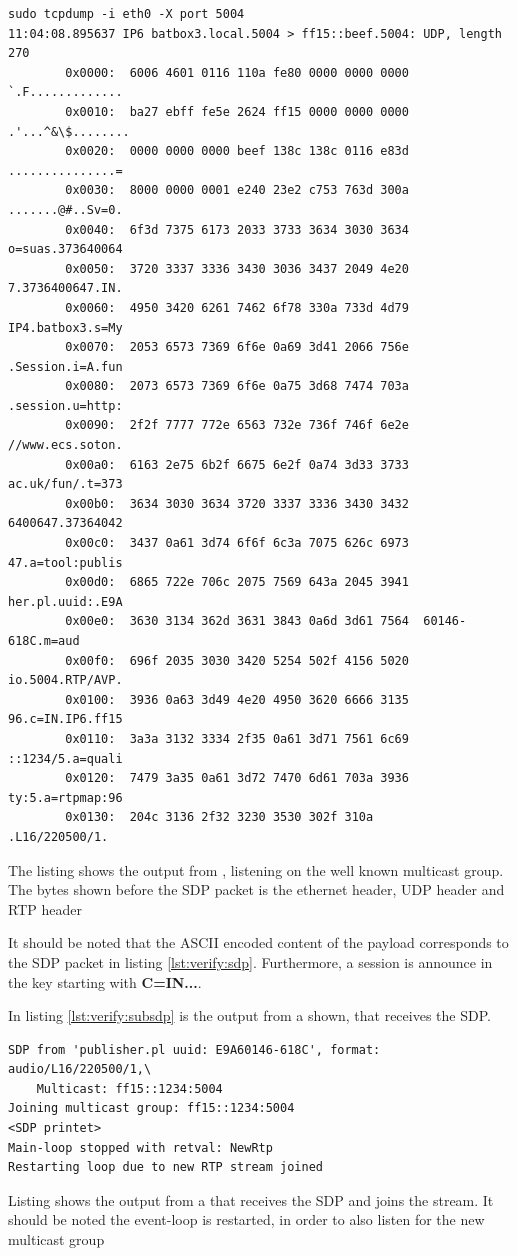 \begin{listing}[H] 
	\begin{verbatim}
sudo tcpdump -i eth0 -X port 5004
11:04:08.895637 IP6 batbox3.local.5004 > ff15::beef.5004: UDP, length 270
        0x0000:  6006 4601 0116 110a fe80 0000 0000 0000  `.F.............
        0x0010:  ba27 ebff fe5e 2624 ff15 0000 0000 0000  .'...^&\$........
        0x0020:  0000 0000 0000 beef 138c 138c 0116 e83d  ...............=
        0x0030:  8000 0000 0001 e240 23e2 c753 763d 300a  .......@#..Sv=0.
        0x0040:  6f3d 7375 6173 2033 3733 3634 3030 3634  o=suas.373640064
        0x0050:  3720 3337 3336 3430 3036 3437 2049 4e20  7.3736400647.IN.
        0x0060:  4950 3420 6261 7462 6f78 330a 733d 4d79  IP4.batbox3.s=My
        0x0070:  2053 6573 7369 6f6e 0a69 3d41 2066 756e  .Session.i=A.fun
        0x0080:  2073 6573 7369 6f6e 0a75 3d68 7474 703a  .session.u=http:
        0x0090:  2f2f 7777 772e 6563 732e 736f 746f 6e2e  //www.ecs.soton.
        0x00a0:  6163 2e75 6b2f 6675 6e2f 0a74 3d33 3733  ac.uk/fun/.t=373
        0x00b0:  3634 3030 3634 3720 3337 3336 3430 3432  6400647.37364042
        0x00c0:  3437 0a61 3d74 6f6f 6c3a 7075 626c 6973  47.a=tool:publis
        0x00d0:  6865 722e 706c 2075 7569 643a 2045 3941  her.pl.uuid:.E9A
        0x00e0:  3630 3134 362d 3631 3843 0a6d 3d61 7564  60146-618C.m=aud
        0x00f0:  696f 2035 3030 3420 5254 502f 4156 5020  io.5004.RTP/AVP.
        0x0100:  3936 0a63 3d49 4e20 4950 3620 6666 3135  96.c=IN.IP6.ff15
        0x0110:  3a3a 3132 3334 2f35 0a61 3d71 7561 6c69  ::1234/5.a=quali
        0x0120:  7479 3a35 0a61 3d72 7470 6d61 703a 3936  ty:5.a=rtpmap:96
        0x0130:  204c 3136 2f32 3230 3530 302f 310a       .L16/220500/1.
	\end{verbatim}
\caption{The listing shows the output from , listening on the well known multicast group. The bytes shown before the SDP packet is the ethernet header, UDP header and RTP header}
\label{lst:verify:tcpdumpsdp}
\end{listing}

It should be noted that the ASCII encoded content of the payload corresponds to the SDP packet in listing \ref{lst:verify:sdp}. Furthermore, a session is announce in the key starting with \textbf{C=IN...}.

In listing \ref{lst:verify:subsdp} is the output from a \sub{} shown, that receives the SDP.


\begin{listing}[H] 
\begin{verbatim}
SDP from 'publisher.pl uuid: E9A60146-618C', format: audio/L16/220500/1,\
	Multicast: ff15::1234:5004
Joining multicast group: ff15::1234:5004
<SDP printet>
Main-loop stopped with retval: NewRtp
Restarting loop due to new RTP stream joined
\end{verbatim}
\caption{Listing shows the output from a \sub{} that receives the SDP and joins the stream. It should be noted the event-loop is restarted, in order to also listen for the new multicast group}
\label{lst:verify:subsdp}
\end{listing}

